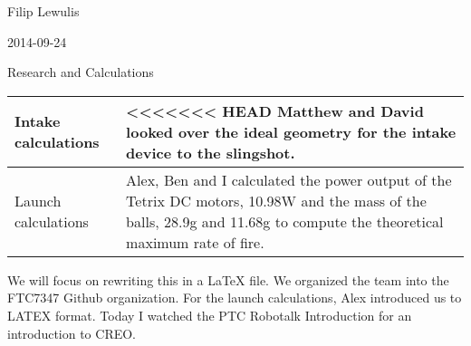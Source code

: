 Filip Lewulis

2014-09-24

Research and Calculations

\begin{tabular}{|p{5cm}|p{5cm}}
  \hline
Intake calculations
  &
<<<<<<< HEAD
Matthew and David looked over the ideal geometry for the intake device to the slingshot.
\\
\hline
Launch calculations
  &
Alex, Ben and I calculated the power output of the Tetrix DC motors, 10.98W and the mass of the balls, 28.9g and 11.68g to compute the theoretical maximum rate of fire.
\\
  \hline
\end{tabular}
We will focus on rewriting this in a LaTeX file.
We organized the team into the FTC7347 Github organization. For the launch calculations,
Alex introduced us to LATEX format. Today I watched the PTC Robotalk Introduction for
an introduction to CREO.
